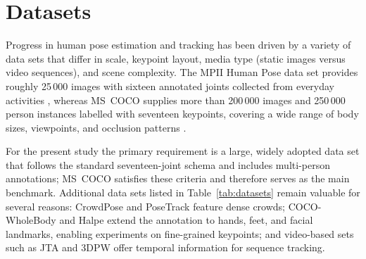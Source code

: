 \section{Datasets}

Progress in human pose estimation and tracking has been driven by a variety of
data sets that differ in scale, keypoint layout, media type (static images
versus video sequences), and scene complexity. The MPII Human Pose data set
provides roughly 25\,000 images with sixteen annotated joints collected from
everyday activities \cite{andriluka14cvpr}, whereas MS~COCO supplies more than
200\,000 images and 250\,000 person instances labelled with seventeen
keypoints, covering a wide range of body sizes, viewpoints, and occlusion
patterns \cite{lin2014microsoft}.

For the present study the primary requirement is a large, widely adopted data
set that follows the standard seventeen-joint schema and includes multi-person
annotations; MS~COCO satisfies these criteria and therefore serves as the main
benchmark. Additional data sets listed in Table~\ref{tab:datasets} remain
valuable for several reasons: CrowdPose \cite{li2019crowdpose} and PoseTrack
\cite{andriluka2018posetrack} feature dense crowds; COCO-WholeBody
\cite{jin2020whole} and Halpe \cite{alphapose} extend the annotation to hands,
feet, and facial landmarks, enabling experiments on fine-grained keypoints; and
video-based sets such as JTA \cite{fabbri2018learning} and 3DPW
\cite{vonMarcard2018} offer temporal information for sequence tracking.

